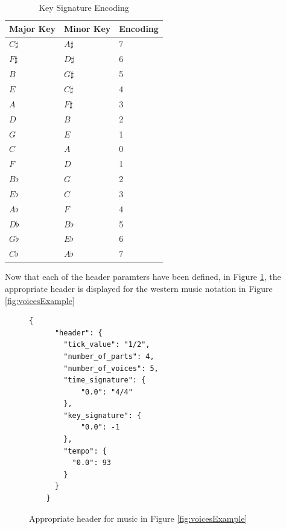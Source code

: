 \begin{table}[ht]
  \centering
  \begin{tabular}{lll}
    Major Key & Minor Key & Encoding \\ \hline
    $C\sharp$   & $A\sharp$   & 7        \\
    $F\sharp$   & $D\sharp$   & 6        \\
    $B$         & $G\sharp$   & 5        \\
    $E$         & $C\sharp$   & 4        \\
    $A$         & $F\sharp$   & 3        \\
    $D$         & $B$         & 2        \\
    $G$         & $E$         & 1        \\
    $C$         & $A$         & 0        \\
    $F$         & $D$         & 1        \\
    $B\flat$    & $G$         & 2        \\
    $E\flat$    & $C$         & 3        \\
    $A\flat$    & $F$         & 4        \\
    $D\flat$    & $B\flat$    & 5        \\
    $G\flat$    & $E\flat$    & 6        \\
    $C\flat$    & $A\flat$    & 7        
  \end{tabular}
  \caption{Key Signature Encoding}
  \label{tab:keySignatures}
\end{table}

Now that each of the header paramters have been defined, in Figure \ref{fig:voicesHeader}, the appropriate header is displayed for the western music notation in Figure \ref{fig:voicesExample}

\begin{figure}
  \begin{center}
    \begin{Verbatim}[fontfamily=courier, xleftmargin=\parindent]
    {
      "header": {
        "tick_value": "1/2",
        "number_of_parts": 4,
        "number_of_voices": 5,
        "time_signature": {
            "0.0": "4/4"
        },
        "key_signature": {
            "0.0": -1
        },
        "tempo": {
          "0.0": 93
        }
      }
    }
    \end{Verbatim}
    \caption{Appropriate header for music in Figure \ref{fig:voicesExample}}
    \label{fig:voicesHeader}
  \end{center}
\end{figure}